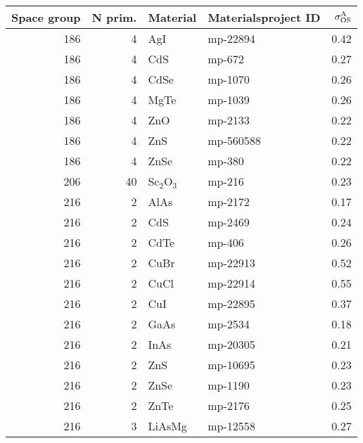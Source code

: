 \begin{table*}[t]
\small
  \begin{center}
\begin{tabular}{rrllr}
\toprule
 Space group &  N prim. &     Material & Materialsproject ID &  $\sigma^\mathrm{A}_\mathrm{OS}$ \\
\midrule         
  
         186 &            4 &          AgI &   mp-22894 &       0.42 \\
         186 &            4 &          CdS &     mp-672 &       0.27 \\
         186 &            4 &         CdSe &    mp-1070 &       0.26 \\
         186 &            4 &         MgTe &    mp-1039 &       0.26 \\
         186 &            4 &          ZnO &    mp-2133 &       0.22 \\
         186 &            4 &          ZnS &  mp-560588 &       0.22 \\
         186 &            4 &         ZnSe &     mp-380 &       0.22 \\
         206 &           40 &  Sc$_2$O$_3$ &     mp-216 &       0.23 \\
         216 &            2 &         AlAs &    mp-2172 &       0.17 \\
         216 &            2 &          CdS &    mp-2469 &       0.24 \\
         216 &            2 &         CdTe &     mp-406 &       0.26 \\
         216 &            2 &         CuBr &   mp-22913 &       0.52 \\
         216 &            2 &         CuCl &   mp-22914 &       0.55 \\
         216 &            2 &          CuI &   mp-22895 &       0.37 \\
         216 &            2 &         GaAs &    mp-2534 &       0.18 \\
         216 &            2 &         InAs &   mp-20305 &       0.21 \\
         216 &            2 &          ZnS &   mp-10695 &       0.23 \\
         216 &            2 &         ZnSe &    mp-1190 &       0.23 \\
         216 &            2 &         ZnTe &    mp-2176 &       0.25 \\
         216 &            3 &       LiAsMg &   mp-12558 &       0.27 \\

\end{tabular}
\end{center}
\end{table*}

